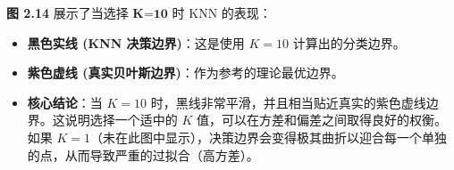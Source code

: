 \documentclass[UTF8]{ctexart}
\numberwithin{equation}{section}
\begin{document}
\textbf{图 2.14} 展示了当选择 $\textbf{K=10}$ 时 KNN 的表现：
\begin{itemize}
    \item \textbf{黑色实线 (KNN 决策边界)}：这是使用 $K=10$ 计算出的分类边界。
    \item \textbf{紫色虚线 (真实贝叶斯边界)}：作为参考的理论最优边界。
    \item \textbf{核心结论}：当 $K=10$ 时，黑线非常平滑，并且相当贴近真实的紫色虚线边界。这说明选择一个适中的 $K$ 值，可以在方差和偏差之间取得良好的权衡。如果 $K=1$（未在此图中显示），决策边界会变得极其曲折以迎合每一个单独的点，从而导致严重的过拟合（高方差）。
\end{itemize}
\end{document}
